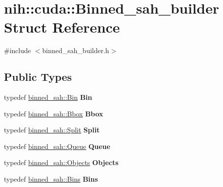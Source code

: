 \hypertarget{structnih_1_1cuda_1_1_binned__sah__builder}{
\section{nih\-:\-:cuda\-:\-:\-Binned\-\_\-sah\-\_\-builder \-Struct \-Reference}
\label{structnih_1_1cuda_1_1_binned__sah__builder}
}


{\ttfamily \#include $<$binned\-\_\-sah\-\_\-builder.\-h$>$}

\subsection*{\-Public \-Types}
\begin{DoxyCompactItemize}
\item 
\hypertarget{structnih_1_1cuda_1_1_binned__sah__builder_a554246500d49d52401d258d3bb26ba6a}{
typedef \hyperlink{structnih_1_1cuda_1_1binned__sah_1_1_bin}{binned\-\_\-sah\-::\-Bin} {\bfseries \-Bin}}
\label{structnih_1_1cuda_1_1_binned__sah__builder_a554246500d49d52401d258d3bb26ba6a}

\item 
\hypertarget{structnih_1_1cuda_1_1_binned__sah__builder_ac01ca50df0ebd0c560e9c800adcef6c3}{
typedef \hyperlink{structnih_1_1cuda_1_1binned__sah_1_1_bbox}{binned\-\_\-sah\-::\-Bbox} {\bfseries \-Bbox}}
\label{structnih_1_1cuda_1_1_binned__sah__builder_ac01ca50df0ebd0c560e9c800adcef6c3}

\item 
\hypertarget{structnih_1_1cuda_1_1_binned__sah__builder_afbe5b0cc5e44ee0728ece73979df0bf5}{
typedef \hyperlink{structnih_1_1cuda_1_1binned__sah_1_1_split}{binned\-\_\-sah\-::\-Split} {\bfseries \-Split}}
\label{structnih_1_1cuda_1_1_binned__sah__builder_afbe5b0cc5e44ee0728ece73979df0bf5}

\item 
\hypertarget{structnih_1_1cuda_1_1_binned__sah__builder_ae39fd7cb95dcceddf4ad19a2680370f6}{
typedef \hyperlink{structnih_1_1cuda_1_1binned__sah_1_1_queue}{binned\-\_\-sah\-::\-Queue} {\bfseries \-Queue}}
\label{structnih_1_1cuda_1_1_binned__sah__builder_ae39fd7cb95dcceddf4ad19a2680370f6}

\item 
\hypertarget{structnih_1_1cuda_1_1_binned__sah__builder_a0fb222ee587dd4e8977bc6b73dc423b5}{
typedef \hyperlink{structnih_1_1cuda_1_1binned__sah_1_1_objects}{binned\-\_\-sah\-::\-Objects} {\bfseries \-Objects}}
\label{structnih_1_1cuda_1_1_binned__sah__builder_a0fb222ee587dd4e8977bc6b73dc423b5}

\item 
\hypertarget{structnih_1_1cuda_1_1_binned__sah__builder_a9b763e41dcd445d72fd86c15bf46fd48}{
typedef \hyperlink{structnih_1_1cuda_1_1binned__sah_1_1_bins}{binned\-\_\-sah\-::\-Bins} {\bfseries \-Bins}}
\label{structnih_1_1cuda_1_1_binned__sah__builder_a9b763e41dcd445d72fd86c15bf46fd48}

\end{DoxyCompactItemize}
